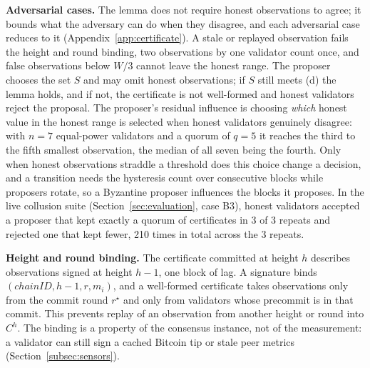 \textbf{Adversarial cases.} The lemma does not require honest observations to
agree; it bounds what the adversary can do when they disagree, and each
adversarial case reduces to it (Appendix~\ref{app:certificate}). A stale or
replayed observation fails the height and round binding, two observations by one
validator count once, and false observations below $W/3$ cannot leave the honest
range. The proposer chooses the set $S$ and may omit honest observations; if $S$
still meets (d) the lemma holds, and if not, the certificate is not well-formed
and honest validators reject the proposal. The proposer's residual influence is
choosing \emph{which} honest value in the honest range is selected when honest
validators genuinely disagree: with $n{=}7$ equal-power validators and a quorum
of $q{=}5$ it reaches the third to the fifth smallest observation, the median of
all seven being the fourth. Only when honest observations straddle a threshold
does this choice change a decision, and a transition needs the hysteresis count
over consecutive blocks while proposers rotate, so a Byzantine proposer influences
the blocks it proposes. In the live collusion suite (Section~\ref{sec:evaluation},
case B3), honest validators accepted a proposer that kept exactly a quorum of
certificates in 3 of 3 repeats and rejected one that kept fewer, 210 times in total
across the 3 repeats.

\textbf{Height and round binding.} The certificate committed at height $h$
describes observations signed at height $h{-}1$, one block of lag. A
signature binds $(\mathit{chainID}, h{-}1, r, m_i)$, and a well-formed
certificate takes observations only from the commit round $r^{\star}$ and
only from validators whose precommit is in that commit.
This prevents replay of an observation from another height or round into
$C^{h}$. The binding is a property of the consensus instance, not of the
measurement: a validator can still sign a cached Bitcoin tip or stale peer
metrics (Section~\ref{subsec:sensors}).

